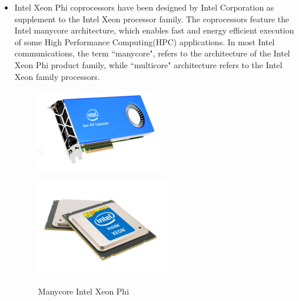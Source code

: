 \documentclass[12pt]{article}
\begin{document}
\begin{itemize}
\item Intel Xeon Phi coprocessors have been designed by Intel Corporation as supplement to the Intel Xeon processor family. The coprocessors feature the Intel manycore architecture, which enables fast and energy efficient execution of some High Performance Computing(HPC) applications. In most Intel communications, the term ``manycore", refers to the architecture of the Intel Xeon Phi product family, while ``multicore" architecture refers to the Intel Xeon family processors.

\begin{figure}[ht] 
  \begin{minipage}[b]{0.5\linewidth}
    \centering
      {\includegraphics[width=0.95\linewidth]{chainer2.png}}
   	\caption{Manycore Intel Xeon Phi}
  \end{minipage}%
  \begin{minipage}[b]{0.5\linewidth}
    \centering
      {\includegraphics[width=0.95\linewidth]{chainer1.png}} 

\end{minipage}
\end{figure}
\end{itemize}
\end{document}
